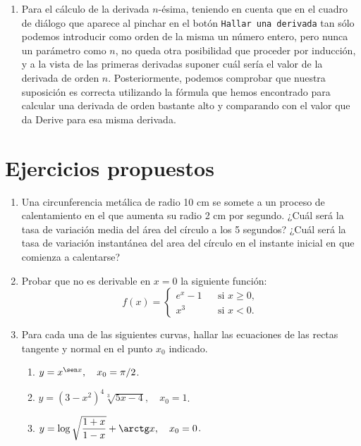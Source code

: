 \begin{enumerate}[leftmargin=*]
\begin{indication}
{\begin{enumerate}
\item Para el cálculo de la derivada $n$-ésima, teniendo en cuenta
que en el cuadro de diálogo que aparece al pinchar en el botón
\texttt{Hallar una derivada} tan sólo podemos introducir como
orden de la misma un número entero, pero nunca un parámetro como
$n$, no queda otra posibilidad que proceder por inducción, y a la
vista de las primeras derivadas suponer cuál sería el valor de la
derivada de orden $n$. Posteriormente, podemos comprobar que
nuestra suposición es correcta utilizando la fórmula que hemos
encontrado para calcular una derivada de orden bastante alto y
comparando con el valor que da Derive para esa misma derivada.

\end{enumerate}
}
\end{indication}


\end{enumerate}

\section{Ejercicios propuestos}
\begin{enumerate}[leftmargin=*]

\item Una circunferencia metálica de radio 10 cm  se somete a un proceso de calentamiento en el que aumenta su radio 2 cm por segundo. ¿Cuál será la tasa de variación media del área del círculo a los 5 segundos? ¿Cuál será la tasa de variación instantánea del area del círculo en el instante inicial en que comienza a calentarse?

\item  Probar que no es derivable en $x=0$ la siguiente función:
\[ f(x)=\left\{
\begin{array}{ccl}
    e^x-1 &  & \mbox{si } x\geq 0,  \\
    x^3 &  & \mbox{si } x<0.
\end{array}\right.
\]

\item  Para cada una de las siguientes curvas, hallar las ecuaciones
de las rectas tangente y normal en el punto $x_{0}$ indicado.
\begin{enumerate}
    \item  $y=x^{\sen x},\quad x_{0}=\pi/2$.

    \item  $y=(3-x^2)^4\sqrt[3]{5x-4},\quad x_{0}=1$.

    \item  $y=\log \sqrt{\dfrac{1+x}{1-x}}+\arctg x, \quad x_{0}=0$.
\end{enumerate}

\end{enumerate}

